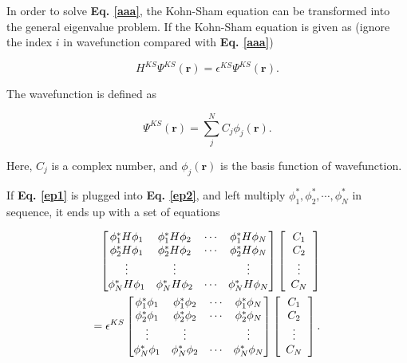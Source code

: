 \documentclass[a4paper, 12pt, titlepage,oneside,drop]{kthesis}
\begin{document}
In order to solve \textbf{Eq. \ref{aaa}}, the Kohn-Sham equation can be transformed into the general eigenvalue problem. If the Kohn-Sham equation is given as (ignore the index $i$ in wavefunction compared with \textbf{Eq. \ref{aaa}})

\begin{equation}\label{ep2}
 H^{KS} \Psi^{KS} (\textbf{r}) = \epsilon^{KS} \Psi^{KS} (\textbf{r}).
\end{equation}
 

The wavefunction is defined as

\begin{equation}\label{ep1}
 \Psi^{KS} (\textbf{r}) = \sum\limits_j^N C_j \phi_j (\textbf{r}).
\end{equation}
 
Here, $C_j$ is a complex number, and $\phi_j (\textbf{r})$ is the basis function of wavefunction. 


If \textbf{Eq. \ref{ep1}} is plugged into \textbf{Eq. \ref{ep2}}, and left multiply $\phi^*_1, \phi^*_2, \cdots, \phi^*_N$ in sequence, it ends up with a set of equations

\begin{equation}\begin{split}\label{ep3}
\left[
\begin{matrix}
    \phi^*_1 {H} \phi_1 & \phi^*_1 {H} \phi_2 & \cdots & \phi^*_1 {H} \phi_N \\
    \phi^*_2 {H} \phi_1 & \phi^*_2 {H} \phi_2 & \cdots & \phi^*_2 {H} \phi_N \\
    \vdots               & \vdots               &        & \vdots               \\
    \phi^*_N {H} \phi_1 & \phi^*_N {H} \phi_2 & \cdots & \phi^*_N {H} \phi_N \\
\end{matrix} \right] \left[ \begin{array}{c} C_1 \\ C_2 \\ \vdots \\ C_N\end{array} \right] \\
= \epsilon^{KS} \left[
\begin{matrix}
   \phi^*_1 \phi_1 & \phi^*_1 \phi_2 & \cdots & \phi^*_1 \phi_N \\
   \phi^*_2 \phi_1 & \phi^*_2 \phi_2 & \cdots & \phi^*_2 \phi_N \\
    \vdots               & \vdots               &        & \vdots               \\
   \phi^*_N \phi_1 & \phi^*_N \phi_2 & \cdots & \phi^*_N \phi_N \\
\end{matrix} \right]\left[ \begin{array}{c} C_1 \\ C_2 \\ \vdots \\ C_N\end{array} \right].
\end{split}\end{equation}
\end{document}
